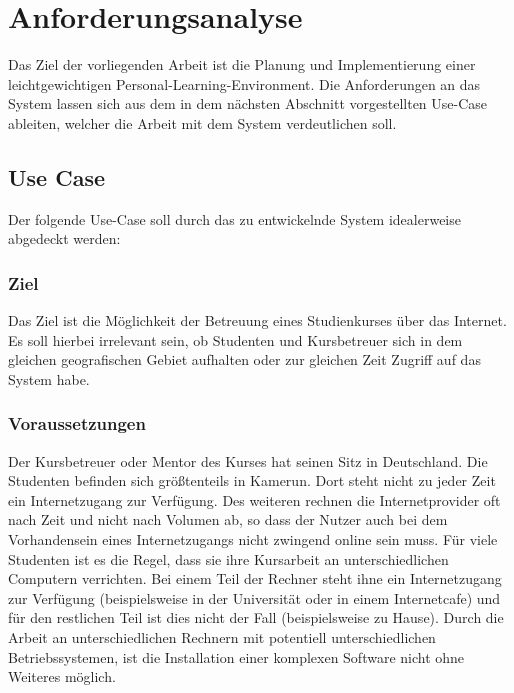 \chapter{Anforderungsanalyse} 
\label{section:anforderungsanalyse}

Das Ziel der vorliegenden Arbeit ist die Planung und Implementierung einer leichtgewichtigen Personal-Learning-Environment. Die Anforderungen an das System lassen sich aus dem in dem nächsten Abschnitt vorgestellten Use-Case ableiten, welcher die Arbeit mit dem System verdeutlichen soll.

\section{Use Case}
Der folgende Use-Case soll durch das zu entwickelnde System idealerweise abgedeckt werden:

\subsection{Ziel}
Das Ziel ist die Möglichkeit der Betreuung eines Studienkurses über das Internet. Es soll hierbei irrelevant sein, ob Studenten und Kursbetreuer sich in dem gleichen geografischen Gebiet aufhalten oder zur gleichen Zeit Zugriff auf das System habe.

\subsection{Voraussetzungen}
Der Kursbetreuer oder Mentor des Kurses hat seinen Sitz in Deutschland. Die Studenten befinden sich größtenteils in Kamerun. Dort steht nicht zu jeder Zeit ein Internetzugang zur Verfügung. Des weiteren rechnen die Internetprovider oft nach Zeit und nicht nach Volumen ab, so dass der Nutzer auch bei dem Vorhandensein eines Internetzugangs nicht zwingend online sein muss. Für viele Studenten ist es die Regel, dass sie ihre Kursarbeit an unterschiedlichen Computern verrichten. Bei einem Teil der Rechner steht ihne ein Internetzugang zur Verfügung (beispielsweise in der Universität oder in einem Internetcafe) und für den restlichen Teil ist dies nicht der Fall (beispielsweise zu Hause). Durch die Arbeit an unterschiedlichen Rechnern mit potentiell unterschiedlichen Betriebssystemen, ist die Installation einer komplexen Software nicht ohne Weiteres möglich.

